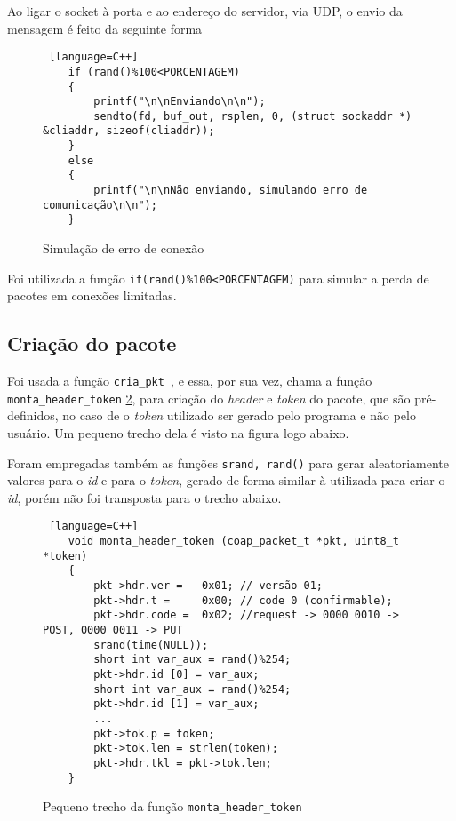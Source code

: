 Ao ligar o socket à porta e ao endereço do servidor, via UDP, o envio da mensagem é feito da seguinte forma

\begin{figure}[!htb]
	\begin{lstlisting} [language=C++]
	if (rand()%100<PORCENTAGEM)
	{
		printf("\n\nEnviando\n\n");
		sendto(fd, buf_out, rsplen, 0, (struct sockaddr *) &cliaddr, sizeof(cliaddr));
	}
	else
	{
		printf("\n\nNão enviando, simulando erro de comunicação\n\n");
	}    
	\end{lstlisting}
	\caption{Simulação de erro de conexão}
	\label{code:simulacao_erro_conexao}
\end{figure}

Foi utilizada a função \texttt{if(rand()\%100<PORCENTAGEM)} para simular a perda de pacotes em conexões limitadas.


\subsection{Criação do pacote}

Foi usada a função \texttt{cria\_pkt }, e essa, por sua vez, chama a função  \texttt{monta\_header\_token} \ref{code:monta_header_token}, para criação do \textit{header} e \textit{token} do pacote, que são pré-definidos, no caso de o \textit{token} utilizado ser gerado pelo programa e não pelo usuário. Um pequeno trecho dela é visto na figura logo abaixo.

Foram empregadas também as funções \texttt{srand, rand()} para gerar aleatoriamente valores para o \textit{id} e para o \textit{token}, gerado de forma similar à utilizada para criar o \textit{id}, porém não foi transposta para o trecho abaixo.

\begin{figure}[!htb]
	\begin{lstlisting} [language=C++]
	void monta_header_token (coap_packet_t *pkt, uint8_t *token)
	{
		pkt->hdr.ver = 	 0x01; // versão 01;
		pkt->hdr.t = 	 0x00; // code 0 (confirmable);
		pkt->hdr.code =  0x02; //request -> 0000 0010 -> POST, 0000 0011 -> PUT
		srand(time(NULL));
		short int var_aux = rand()%254;
		pkt->hdr.id [0] = var_aux;
		short int var_aux = rand()%254;
		pkt->hdr.id [1] = var_aux;
		...
		pkt->tok.p = token;
		pkt->tok.len = strlen(token);
		pkt->hdr.tkl = pkt->tok.len;
	}
	\end{lstlisting}
	\caption{Pequeno trecho da função \texttt{monta\_header\_token}}
	\label{code:monta_header_token}
\end{figure} 

